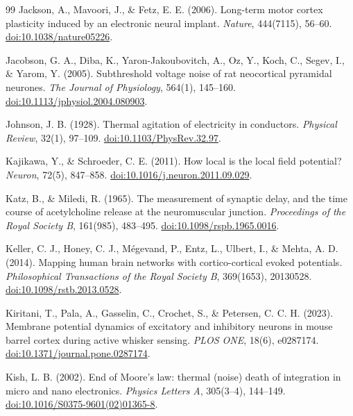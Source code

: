 \begin{thebibliography}{99}
 Jackson, A., Mavoori, J., \& Fetz, E. E. (2006). Long-term motor cortex plasticity induced by an electronic neural implant. \textit{Nature}, 444(7115), 56--60. \href{https://doi.org/10.1038/nature05226}{doi:10.1038/nature05226}.

 Jacobson, G. A., Diba, K., Yaron-Jakoubovitch, A., Oz, Y., Koch, C., Segev, I., \& Yarom, Y. (2005). Subthreshold voltage noise of rat neocortical pyramidal neurones. \textit{The Journal of Physiology}, 564(1), 145--160. \href{https://doi.org/10.1113/jphysiol.2004.080903}{doi:10.1113/jphysiol.2004.080903}.

 Johnson, J. B. (1928). Thermal agitation of electricity in conductors. \textit{Physical Review}, 32(1), 97--109. \href{https://doi.org/10.1103/PhysRev.32.97}{doi:10.1103/PhysRev.32.97}.

 Kajikawa, Y., \& Schroeder, C. E. (2011). How local is the local field potential? \textit{Neuron}, 72(5), 847--858. \href{https://doi.org/10.1016/j.neuron.2011.09.029}{doi:10.1016/j.neuron.2011.09.029}.

 Katz, B., \& Miledi, R. (1965). The measurement of synaptic delay, and the time course of acetylcholine release at the neuromuscular junction. \textit{Proceedings of the Royal Society B}, 161(985), 483--495. \href{https://doi.org/10.1098/rspb.1965.0016}{doi:10.1098/rspb.1965.0016}.

 Keller, C. J., Honey, C. J., M\'{e}gevand, P., Entz, L., Ulbert, I., \& Mehta, A. D. (2014). Mapping human brain networks with cortico-cortical evoked potentials. \textit{Philosophical Transactions of the Royal Society B}, 369(1653), 20130528. \href{https://doi.org/10.1098/rstb.2013.0528}{doi:10.1098/rstb.2013.0528}.

 Kiritani, T., Pala, A., Gasselin, C., Crochet, S., \& Petersen, C. C. H. (2023). Membrane potential dynamics of excitatory and inhibitory neurons in mouse barrel cortex during active whisker sensing. \textit{PLOS ONE}, 18(6), e0287174. \href{https://doi.org/10.1371/journal.pone.0287174}{doi:10.1371/journal.pone.0287174}.

 Kish, L. B. (2002). End of Moore's law: thermal (noise) death of integration in micro and nano electronics. \textit{Physics Letters A}, 305(3--4), 144--149. \href{https://doi.org/10.1016/S0375-9601(02)01365-8}{doi:10.1016/S0375-9601(02)01365-8}.


\end{thebibliography}
